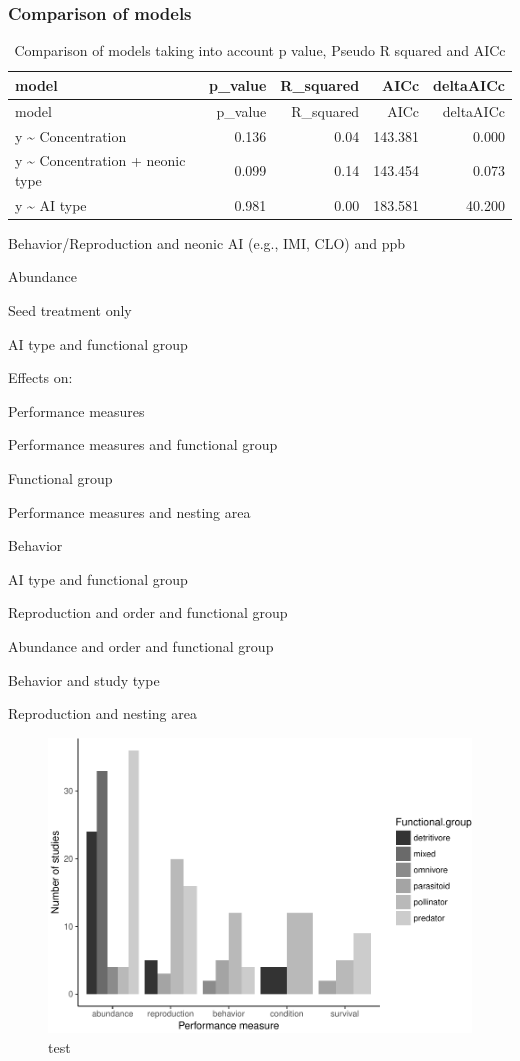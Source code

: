 \documentclass[]{elsarticle} %
\makeatletter
\def\maxwidth{\ifdim\Gin@nat@width>\linewidth\linewidth
\else\Gin@nat@width\fi}
\let\Oldincludegraphics\includegraphics
\renewcommand{\includegraphics}[1]{\Oldincludegraphics[width=\maxwidth]{#1}}
\makeatother
\begin{document}
\subsubsection{Comparison of models}\label{comparison-of-models-1}

\begin{longtable}[c]{@{}lrrrr@{}}
\caption{Comparison of models taking into account p value, Pseudo R
squared and AICc}\tabularnewline
\toprule
model & p\_value & R\_squared & AICc & deltaAICc\tabularnewline
\midrule
\endfirsthead
\toprule
model & p\_value & R\_squared & AICc & deltaAICc\tabularnewline
\midrule
\endhead
y \textasciitilde{} Concentration & 0.136 & 0.04 & 143.381 &
0.000\tabularnewline
y \textasciitilde{} Concentration + neonic type & 0.099 & 0.14 & 143.454
& 0.073\tabularnewline
y \textasciitilde{} AI type & 0.981 & 0.00 & 183.581 &
40.200\tabularnewline
\bottomrule
\end{longtable}

Behavior/Reproduction and neonic AI (e.g., IMI, CLO) and ppb

Abundance

Seed treatment only

AI type and functional group

Effects on:

Performance measures

Performance measures and functional group

Functional group

Performance measures and nesting area

Behavior

AI type and functional group

Reproduction and order and functional group

Abundance and order and functional group

Behavior and study type

Reproduction and nesting area

\begin{figure}[htbp]
\centering
\includegraphics{MetanalysisNeonics_files/figure-latex/unnamed-chunk-26-1.pdf}
\caption{test}
\end{figure}
\end{document}

